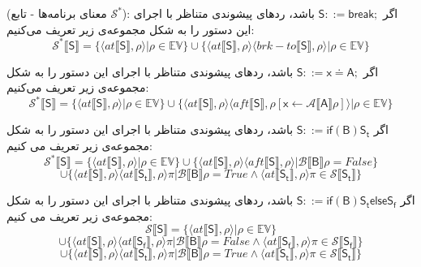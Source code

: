\begin{defn}
	(معنای برنامه‌ها - تابع $\mathcal{S}^*$): 
	اگر $        \mathsf{S} ::= \mathsf{break;}  $ باشد، ردهای پیشوندی متناظر با اجرای این دستور را به شکل مجموعه‌ی زیر تعریف می‌کنیم:
	$$\mathcal{S^*} \llbracket\mathsf{S}\rrbracket = \{ \langle at\llbracket\mathsf{S}\rrbracket , \rho \rangle | \rho \in \mathbb{EV}       \} \cup     \{ \langle at\llbracket\mathsf{S}\rrbracket , \rho \rangle \langle brk-to\llbracket\mathsf{S}\rrbracket , \rho \rangle | \rho \in \mathbb{EV}       \}             $$   
	
	
	اگر $        \mathsf{S} ::=  \mathsf{x\doteq A;}  $ باشد، ردهای پیشوندی متناظر با اجرای این دستور را به شکل مجموعه‌ی زیر تعریف می‌کنیم:
	$$\mathcal{S^*} \llbracket\mathsf{S}\rrbracket = \{ \langle at\llbracket\mathsf{S}\rrbracket , \rho \rangle | \rho \in \mathbb{EV}       \} \cup     \{ \langle at\llbracket\mathsf{S}\rrbracket , \rho \rangle \langle aft\llbracket\mathsf{S}\rrbracket , \rho[\mathsf{x}\leftarrow \mathcal{A}\llbracket\mathsf{A}\rrbracket\rho] \rangle | \rho \in \mathbb{EV}       \}             $$   
	
	اگر $         \mathsf{S} ::= \mathsf{if}  \mathsf{ (B) S_t}  $ باشد، ردهای پیشوندی متناظر با اجرای این دستور را به شکل مجموعه‌ی زیر تعریف می کنیم:
	$$\mathcal{S^*} \llbracket\mathsf{S}\rrbracket = \{ \langle at\llbracket\mathsf{S}\rrbracket , \rho \rangle | \rho \in \mathbb{EV}       \} \cup     \{ \langle at\llbracket\mathsf{S}\rrbracket , \rho \rangle \langle aft\llbracket\mathsf{S}\rrbracket , \rho \rangle | \mathcal{B}\llbracket\mathsf{B}\rrbracket \rho =False      \} 
	$$$$\cup    \{ \langle at\llbracket\mathsf{S}\rrbracket , \rho \rangle \langle at\llbracket\mathsf{S_t}\rrbracket , \rho \rangle 
	\pi | \mathcal{B}\llbracket\mathsf{B}\rrbracket \rho =True  \wedge   \langle  at\llbracket\mathsf{S_t}\rrbracket  , \rho \rangle \pi \in \mathcal{S} \llbracket\mathsf{S_t}\rrbracket    \}          $$ 
	
	
	اگر $         \mathsf{S} ::= \mathsf{if}  \mathsf{ (B) S_t else S_f}  $ باشد، ردهای پیشوندی متناظر با اجرای این دستور را به شکل مجموعه‌ی زیر تعریف می کنیم:
	$$\mathcal{S} \llbracket\mathsf{S}\rrbracket = \{ \langle at\llbracket\mathsf{S}\rrbracket , \rho \rangle | \rho \in \mathbb{EV}       \} $$$$\cup     \{ \langle at\llbracket\mathsf{S}\rrbracket , \rho \rangle \langle at\llbracket\mathsf{S_f}\rrbracket , \rho \rangle 
	\pi | \mathcal{B}\llbracket\mathsf{B}\rrbracket \rho =False  \wedge   \langle  at\llbracket\mathsf{S_f}\rrbracket  , \rho \rangle \pi \in \mathcal{S} \llbracket\mathsf{S_f}\rrbracket    \}  
	$$$$\cup    \{ \langle at\llbracket\mathsf{S}\rrbracket , \rho \rangle \langle at\llbracket\mathsf{S_t}\rrbracket , \rho \rangle 
	\pi | \mathcal{B}\llbracket\mathsf{B}\rrbracket \rho =True  \wedge   \langle  at\llbracket\mathsf{S_t}\rrbracket  , \rho \rangle \pi \in \mathcal{S} \llbracket\mathsf{S_t}\rrbracket    \}          $$ \\
	

\end{defn}
